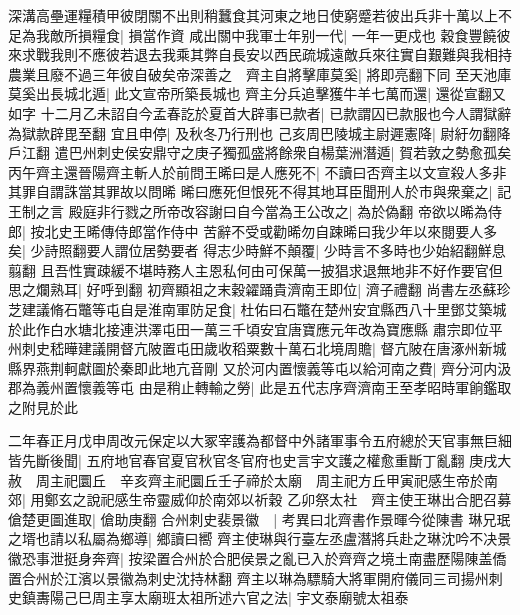 深溝高壘運糧積甲彼閉關不出則稍蠶食其河東之地日使窮蹙若彼出兵非十萬以上不足為我敵所損糧食|{
	損當作資}
咸出關中我軍士年别一代|{
	一年一更戍也}
穀食豐饒彼來求戰我則不應彼若退去我乘其弊自長安以西民疏城遠敵兵來往實自艱難與我相持農業且廢不過三年彼自破矣帝深善之　齊主自將擊庫莫奚|{
	將即亮翻下同}
至天池庫莫奚出長城北遁|{
	此文宣帝所築長城也}
齊主分兵追擊獲牛羊七萬而還|{
	還從宣翻又如字}
十二月乙未詔自今孟春訖於夏首大辟事已款者|{
	已款謂囚已款服也今人謂獄辭為獄款辟毘至翻}
宜且申停|{
	及秋冬乃行刑也}
己亥周巴陵城主尉遲憲降|{
	尉紆勿翻降戶江翻}
遣巴州刺史侯安鼎守之庚子獨孤盛將餘衆自楊葉洲潛遁|{
	賀若敦之勢愈孤矣}
丙午齊主還晉陽齊主斬人於前問王晞曰是人應死不|{
	不讀曰否齊主以文宣殺人多非其罪自謂誅當其罪故以問晞}
晞曰應死但恨死不得其地耳臣聞刑人於市與衆棄之|{
	記王制之言}
殿庭非行戮之所帝改容謝曰自今當為王公改之|{
	為於偽翻}
帝欲以晞為侍郎|{
	按北史王晞傳侍郎當作侍中}
苦辭不受或勸晞勿自踈晞曰我少年以來閱要人多矣|{
	少詩照翻要人謂位居勢要者}
得志少時鮮不顛覆|{
	少時言不多時也少始紹翻鮮息翦翻}
且吾性實疎緩不堪時務人主恩私何由可保萬一披猖求退無地非不好作要官但思之爛熟耳|{
	好呼到翻}
初齊顯祖之末穀糴踊貴濟南王即位|{
	濟子禮翻}
尚書左丞蘇珍芝建議脩石鼈等屯自是淮南軍防足食|{
	杜佑曰石鼈在楚州安宜縣西八十里鄧艾築城於此作白水塘北接連洪澤屯田一萬三千頃安宜唐寶應元年改為寶應縣}
肅宗即位平州刺史嵇曄建議開督亢陂置屯田歲收稻粟數十萬石北境周贍|{
	督亢陂在唐涿州新城縣界燕荆軻獻圖於秦即此地亢音剛}
又於河内置懷義等屯以給河南之費|{
	齊分河内汲郡為義州置懷義等屯}
由是稍止轉輸之勞|{
	此是五代志序齊濟南王至孝昭時軍餉鑑取之附見於此}


二年春正月戊申周改元保定以大冢宰護為都督中外諸軍事令五府總於天官事無巨細皆先斷後聞|{
	五府地官春官夏官秋官冬官府也史言宇文護之權愈重斷丁亂翻}
庚戌大赦　周主祀圜丘　辛亥齊主祀圜丘壬子禘於太廟　周主祀方丘甲寅祀感生帝於南郊|{
	用鄭玄之說祀感生帝靈威仰於南郊以祈穀}
乙卯祭太社　齊主使王琳出合肥召募傖楚更圖進取|{
	傖助庚翻}
合州刺史裴景徽　|{
	考異曰北齊書作景暉今從陳書}
琳兄珉之壻也請以私屬為鄉導|{
	鄉讀曰嚮}
齊主使琳與行臺左丞盧潛將兵赴之琳沈吟不决景徽恐事泄挺身奔齊|{
	按梁置合州於合肥侯景之亂已入於齊齊之境土南盡歷陽陳盖僑置合州於江濱以景徽為刺史沈持林翻}
齊主以琳為驃騎大將軍開府儀同三司揚州刺史鎮夀陽己巳周主享太廟班太祖所述六官之法|{
	宇文泰廟號太祖泰}


